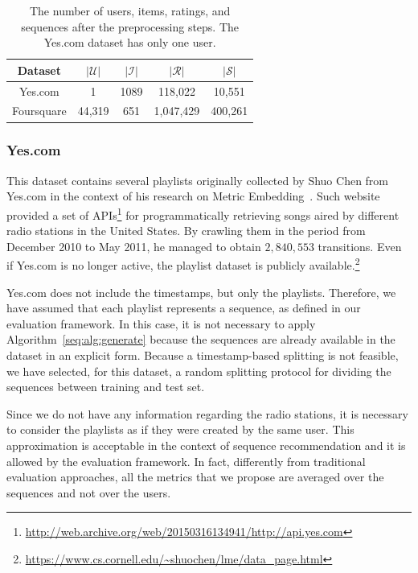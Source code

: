 \begin{table}
\centering
\begin{tabular}{@{}ccccc@{}}
\toprule
Dataset    & $|\mathcal{U}|$ & $|\mathcal{I}|$ & $|\mathcal{R}|$ & $|\mathcal{S}|$ \\ \midrule
Yes.com    & 1               & 1089            & 118,022         & 10,551          \\
Foursquare & 44,319          & 651             & 1,047,429       & 400,261         \\ \bottomrule
\end{tabular}
\caption[Statistics about the sequences]{The number of users, items, ratings, and sequences after the preprocessing steps. The Yes.com dataset has only one user.}
\label{seq:tab:datasets-stats}
\end{table}

\subsubsection{Yes.com}

This dataset contains several playlists originally collected by Shuo Chen from {Yes.com} in the context of his research on Metric Embedding~\cite{Chen2012}. Such website provided a set of APIs\footnote{\url{http://web.archive.org/web/20150316134941/http://api.yes.com}} for programmatically retrieving songs aired by different radio stations in the United States. By crawling them in the period from December 2010 to May 2011, he managed to obtain $2,840,553$ transitions. Even if {Yes.com} is no longer active, the playlist dataset is publicly available.\footnote{\url{https://www.cs.cornell.edu/~shuochen/lme/data_page.html}}

Yes.com does not include the timestamps, but only the playlists. Therefore, we have assumed that each playlist represents a sequence, as defined in our evaluation framework. In this case, it is not necessary to apply Algorithm~\ref{seq:alg:generate} because the sequences are already available in the dataset in an explicit form. Because a timestamp-based splitting is not feasible, we have selected, for this dataset, a random splitting protocol for dividing the sequences between training and test set.

Since we do not have any information regarding the radio stations, it is necessary to consider the playlists as if they were created by the same user. This approximation is acceptable in the context of sequence recommendation and it is allowed by the evaluation framework. In fact, differently from traditional evaluation approaches, all the metrics that we propose are averaged over the sequences and not over the users. 

